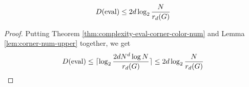\begin{corollary}
  \label{cor:complexity-eval-corner-free-num}

  $$D(\operatorname{eval}) \le 2d\log_2\frac N{r_d(G)}$$ %
\end{corollary}
\begin{proof}

  Putting Theorem \ref{thm:complexity-eval-corner-color-num} and Lemma \ref{lem:corner-num-upper} together, we get
  $$D(\operatorname{eval}) \le \lceil\log_2\frac{2dN^d\log N}{r_d(G)}\rceil \le 2d\log_2\frac N{r_d(G)}$$
\end{proof}
